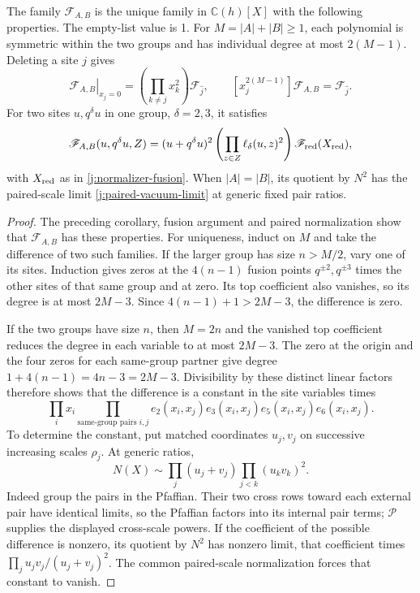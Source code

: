 \begin{lemma}\label{j:scalar-characterization}
The family $\mathscr F_{A,B}$ is the unique family in
$\mathbb C(h)[X]$ with the following properties. The empty-list value
is 1. For $M=|A|+|B|\ge1$, each polynomial is symmetric within the
two groups and has individual degree at most $2(M-1)$. Deleting a
site $j$ gives
\[
\left.\mathscr F_{A,B}\right|_{x_j=0}
 =\left(\prod_{k\ne j}x_k^2\right)\mathscr F_{\widehat j},
\qquad
[x_j^{2(M-1)}]\mathscr F_{A,B}=\mathscr F_{\widehat j}.
\]
For two sites $u,q^\delta u$ in one group, $\delta=2,3$, it satisfies
\[
\mathscr F_{A,B}(u,q^\delta u,Z)
 =(u+q^\delta u)^2
 \left(\prod_{z\in Z}\ell_\delta(u,z)^2\right)
 \mathscr F_{\rm red}(X_{\rm red}),
\]
with $X_{\rm red}$ as in \eqref{j:normalizer-fusion}. When
$|A|=|B|$, its quotient by $N^2$ has the paired-scale limit
\eqref{j:paired-vacuum-limit} at generic fixed pair ratios.
\end{lemma}
\begin{proof}
The preceding corollary, fusion argument and paired normalization
show that $\mathscr F_{A,B}$ has these properties. For uniqueness,
induct on $M$ and take the difference of two such families. If the
larger group has size $n>M/2$, vary one of its sites. Induction gives
zeros at the $4(n-1)$ fusion points $q^{\pm2},q^{\pm3}$ times the
other sites of that same group and at zero. Its top coefficient also vanishes,
so its degree is at most $2M-3$. Since $4(n-1)+1>2M-3$, the
difference is zero.

If the two groups have size $n$, then $M=2n$ and the vanished top
coefficient reduces the degree in each variable to at most $2M-3$.
The zero at the origin and the four zeros for each same-group partner
give degree
$1+4(n-1)=4n-3=2M-3$. Divisibility by these distinct linear
factors therefore shows that the difference is a constant in the site
variables times
\[
\prod_i x_i\prod_{\text{same-group pairs }i,j}
 e_2(x_i,x_j)e_3(x_i,x_j)e_5(x_i,x_j)e_6(x_i,x_j).
\]
To determine the constant, put matched coordinates $u_j,v_j$ on
successive increasing scales $\rho_j$. At generic ratios,
\[
N(X)\sim
\prod_j(u_j+v_j)\prod_{j<k}(u_kv_k)^2.
\]
Indeed group the pairs in the Pfaffian. Their two cross rows toward
each external pair have identical limits, so the Pfaffian factors
into its internal pair terms; $\mathcal P$ supplies the displayed
cross-scale powers. If the coefficient of the possible difference is
nonzero, its quotient by $N^2$ has nonzero limit, that coefficient times
$\prod_j u_jv_j/(u_j+v_j)^2$. The common paired-scale normalization
forces that constant to vanish.
\end{proof}


